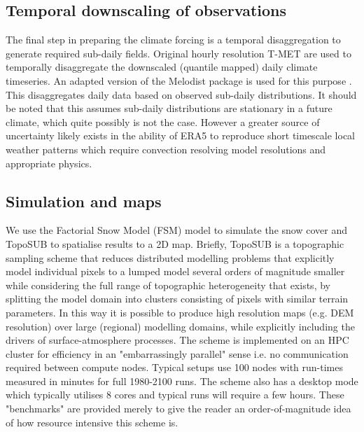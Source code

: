 \documentclass[hess, manuscript]{copernicus}
\begin{document}
\subsection{Temporal downscaling of observations}
The final step in preparing the climate forcing is a temporal disaggregation to generate required sub-daily fields. Original hourly resolution T-MET are used to temporally disaggregate the downscaled (quantile mapped) daily climate timeseries. An adapted version of the Melodist package is used for this purpose \citep{Forster2016-xx}. This disaggregates daily data based on observed sub-daily distributions. It should be noted that this assumes sub-daily distributions are stationary in a future climate, which quite possibly is not the case. However a greater source of uncertainty likely exists in the ability of ERA5 to reproduce short timescale local weather patterns which require convection resolving model resolutions \citep{Liu2017-md} and appropriate physics. %

\subsection{Simulation and maps}
We use the Factorial Snow Model (FSM) model \citep{Essery2015-jv} to simulate the snow cover and TopoSUB \citep{Fiddes2012-td} to spatialise results to a 2D map. Briefly, TopoSUB is a topographic sampling scheme that reduces distributed modelling problems that explicitly model individual pixels to a lumped model several orders of magnitude smaller while considering the full range of topographic heterogeneity that exists, by splitting the model domain into clusters consisting of pixels with similar terrain parameters. In this way it is possible to produce high resolution maps (e.g. DEM resolution) over large (regional) modelling domains, while explicitly including the drivers of surface-atmosphere processes.
The scheme is implemented on an HPC cluster for efficiency in an "embarrassingly parallel" sense i.e. no communication required between compute nodes. Typical setups use 100 nodes with run-times measured in minutes for full 1980-2100 runs. The scheme also has a desktop mode which typically utilises 8 cores and typical runs will require a few hours. These "benchmarks" are provided merely to give the reader an order-of-magnitude idea of how resource intensive this scheme is.
\end{document}
